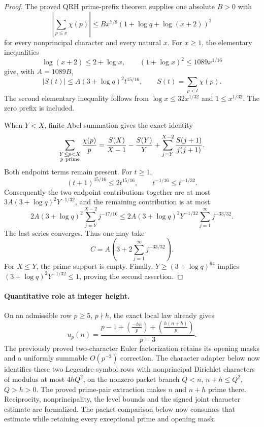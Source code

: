 \documentclass[11pt]{article}
\begin{document}
\begin{proof}
The proved QRH prime-prefix theorem supplies one absolute \(B>0\) with
\[
 \left|\sum_{p\leq x}\chi(p)\right|
 \leq Bx^{7/8}(1+\log q+\log(x+2))^2
\]
for every nonprincipal character and every natural \(x\).
For \(x\geq1\), the elementary inequalities
\[
 \log(x+2)\leq2+\log x,\qquad
 (1+\log x)^2\leq1089x^{1/16}
\]
give, with \(A=1089B\),
\[
 |S(t)|\leq A(3+\log q)^2t^{15/16},
 \qquad S(t)=\sum_{p<t}\chi(p).
\]
The second elementary inequality follows from
\(\log x\leq32x^{1/32}\) and \(1\leq x^{1/32}\).
The zero prefix is included.

When \(Y<X\), finite Abel summation gives the exact identity
\[
 \sum_{\substack{Y\leq p<X\\p\ {\rm prime}}}\frac{\chi(p)}p
 =\frac{S(X)}{X-1}-\frac{S(Y)}Y+
   \sum_{j=Y}^{X-2}\frac{S(j+1)}{j(j+1)}.
\]
Both endpoint terms remain present. For \(t\geq1\),
\[
 (t+1)^{15/16}\leq2t^{15/16},\qquad
 t^{-1/16}\leq t^{-1/32}.
\]
Consequently the two endpoint contributions together are at most
\(3A(3+\log q)^2Y^{-1/32}\), and the remaining contribution is at most
\[
 2A(3+\log q)^2
       \sum_{j=Y}^{X-2}j^{-17/16}
 \leq2A(3+\log q)^2Y^{-1/32}
       \sum_{j=1}^{\infty}j^{-33/32}.
\]
The last series converges. Thus one may take
\[
 C=A\left(3+2\sum_{j=1}^{\infty}j^{-33/32}\right).
\]
For \(X\leq Y\), the prime support is empty. Finally,
\(Y\geq(3+\log q)^{64}\) implies
\((3+\log q)^2Y^{-1/32}\leq1\), proving the second assertion.
\end{proof}

\paragraph{Quantitative role at integer height.}
On an admissible row \(p\geq5\), \(p\nmid h\), the exact local law already gives
\[
 u_p(n)=
 \frac{p-1+\left(\frac{-hn}{p}\right)
              +\left(\frac{h(n+h)}p\right)}{p-3}.
\]
The previously proved two-character Euler factorization retains its
opening masks and a uniformly summable \(O(p^{-2})\) correction.
The character adapter below now identifies these two Legendre-symbol
rows with nonprincipal Dirichlet characters of modulus at most
\(4hQ^2\), on the nonzero packet branch
\(Q<n\), \(n+h\leq Q^2\), \(Q>h>0\).
The proved prime-pair extraction makes \(n\) and \(n+h\) prime there.
Reciprocity, nonprincipality, the level bounds and the signed joint
character estimate are formalized. The packet comparison below now
consumes that estimate while retaining every exceptional prime and opening mask.
\end{document}
